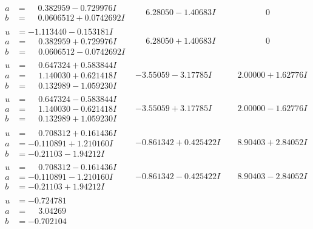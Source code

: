 \documentclass[1p]{elsarticle_modified}
\theoremstyle{definition}
\begin{document}
$$\begin{array}{c|c|c}
\begin{aligned}
a &= \phantom{-}0.382959 - 0.729976 I \\
b &= \phantom{-}0.0606512 + 0.0742692 I\end{aligned}
 & \phantom{-}6.28050 - 1.40683 I & \phantom{-0.000000 } 0 \\ \hline\begin{aligned}
u &= -1.113440 - 0.153181 I \\
a &= \phantom{-}0.382959 + 0.729976 I \\
b &= \phantom{-}0.0606512 - 0.0742692 I\end{aligned}
 & \phantom{-}6.28050 + 1.40683 I & \phantom{-0.000000 } 0 \\ \hline\begin{aligned}
u &= \phantom{-}0.647324 + 0.583844 I \\
a &= \phantom{-}1.140030 + 0.621418 I \\
b &= \phantom{-}0.132989 - 1.059230 I\end{aligned}
 & -3.55059 - 3.17785 I & \phantom{-}2.00000 + 1.62776 I \\ \hline\begin{aligned}
u &= \phantom{-}0.647324 - 0.583844 I \\
a &= \phantom{-}1.140030 - 0.621418 I \\
b &= \phantom{-}0.132989 + 1.059230 I\end{aligned}
 & -3.55059 + 3.17785 I & \phantom{-}2.00000 - 1.62776 I \\ \hline\begin{aligned}
u &= \phantom{-}0.708312 + 0.161436 I \\
a &= -0.110891 + 1.210160 I \\
b &= -0.21103 - 1.94212 I\end{aligned}
 & -0.861342 + 0.425422 I & \phantom{-}8.90403 + 2.84052 I \\ \hline\begin{aligned}
u &= \phantom{-}0.708312 - 0.161436 I \\
a &= -0.110891 - 1.210160 I \\
b &= -0.21103 + 1.94212 I\end{aligned}
 & -0.861342 - 0.425422 I & \phantom{-}8.90403 - 2.84052 I \\ \hline\begin{aligned}
u &= -0.724781\phantom{ +0.000000I} \\
a &= \phantom{-}3.04269\phantom{ +0.000000I} \\
b &= -0.702104\phantom{ +0.000000I}\end{aligned}

\end{array}$$
\end{document}
